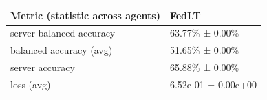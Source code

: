 \begin{tabular}{ll}
\hline
 Metric (statistic across agents)   & FedLT               \\
\hline
 server balanced accuracy           & 63.77\% ± 0.00\%      \\
 balanced accuracy (avg)            & 51.65\% ± 0.00\%      \\
 server accuracy                    & 65.88\% ± 0.00\%      \\
 loss (avg)                         & 6.52e-01 ± 0.00e+00 \\
\hline
\end{tabular}